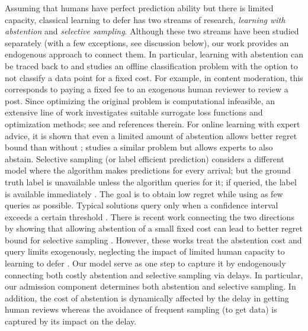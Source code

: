 Assuming that humans have perfect prediction ability but there is limited capacity, classical learning to defer has two streams of research, \emph{learning with abstention} and \emph{selective sampling}. Although these two streams have been studied separately (with a few exceptions, see discussion below), our work provides an endogenous approach to connect them.  In particular, learning with abstention can be traced back to \cite{Chow57,Chow70} and studies an offline classification problem with the option to not classify a data point for a fixed cost. For example, in content moderation, this corresponds to paying a fixed fee to an exogenous human reviewer to review a post. Since optimizing the original problem is computational infeasible, an extensive line of work investigates suitable surrogate loss functions and optimization methods; see \cite{BartlettW08,El-YanivW10,CortesDM16a} and references therein. For online learning with expert advice, it is shown that even a limited amount of abstention allows better regret bound than without \citep{SayediZB10,LiLWS11,ZhangC16,NeuZ20}; \cite{CortesDGMY18} studies a similar problem but allows experts to also abstain. Selective sampling (or label efficient prediction) considers a different model where the algorithm makes predictions for every arrival; but the ground truth label is unavailable unless the algorithm queries for it; if queried, the label is available immediately \citep{Cesa-BianchiLS05}. The goal is to obtain low regret while using as few queries as possible. Typical solutions query only when a confidence interval exceeds a certain threshold \citep{Cesa-BianchiLS05,cesa2009robust,OrabonaC11,DekelGS12}. There is recent work connecting the two directions by showing that allowing abstention of a small fixed cost can lead to better regret bound for selective sampling \citep{Zhu022a,PuchkinZ22}. However, these works treat the abstention cost and query limits exogenously, neglecting  the impact of limited human capacity to learning to defer \citep{Leitao22}. Our model serve as one step to capture it by endogenously connecting both costly abstention and selective sampling via delays. In particular, our admission component determines both abstention and selective sampling. In addition, the cost of abstention is dynamically affected by the delay in getting human reviews whereas the avoidance of frequent sampling (to get data) is captured by its impact on the delay. 

